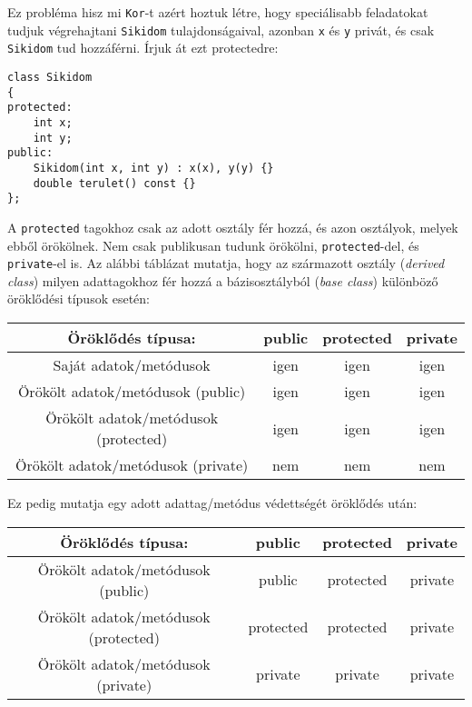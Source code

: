 \documentclass[a4paper,11.5pt,table]{article}
\begin{document}
	Ez probléma hisz mi \texttt{Kor}-t azért hoztuk létre, hogy speciálisabb feladatokat tudjuk végrehajtani \texttt{Sikidom} tulajdonságaival, azonban \texttt{x} és \texttt{y} privát, és csak \texttt{Sikidom} tud hozzáférni. Írjuk át ezt protectedre:
\begin{lstlisting}
class Sikidom
{
protected:
	int x;
	int y;
public:
	Sikidom(int x, int y) : x(x), y(y) {}
	double terulet() const {}
};
\end{lstlisting}
	A \texttt{protected} tagokhoz csak az adott osztály fér hozzá, és azon osztályok, melyek ebből örökölnek. Nem csak publikusan tudunk örökölni, \texttt{protected}-del, és \texttt{private}-el is. Az alábbi táblázat mutatja, hogy az származott osztály (\textit{derived class}) milyen adattagokhoz fér hozzá a bázisosztályból (\textit{base class}) különböző öröklődési típusok esetén:
	\begin{center}
		\setlength{\extrarowheight}{2pt}
		\begin{tabular}{|c||c|c|c|}
			\hline
			Öröklődés típusa:&public&protected&private\\
			\hline
			\hline
			Saját adatok/metódusok& \cellcolor{green!20}igen&\cellcolor{green!20}igen&\cellcolor{green!20}igen\\
			\hline
			Örökölt adatok/metódusok (public)&\cellcolor{green!20}igen&\cellcolor{green!20}igen&\cellcolor{green!20}igen\\
			\hline
			Örökölt adatok/metódusok (protected)&\cellcolor{green!20}igen&\cellcolor{green!20}igen&\cellcolor{green!20}igen\\
			\hline
			Örökölt adatok/metódusok (private)&\cellcolor{red!20}nem&\cellcolor{red!20}nem&\cellcolor{red!20}nem\\
			\hline
		\end{tabular}
	\end{center}
	Ez pedig mutatja egy adott adattag/metódus védettségét öröklődés után:
	\begin{center}
		\begin{tabular}{|c||c|c|c|}
			\hline
			Öröklődés típusa:&public&protected&private\\
			\hline
			\hline
			Örökölt adatok/metódusok (public)&\cellcolor{green!20}public&\cellcolor{orange!20}protected&\cellcolor{red!20}private\\
			\hline
			Örökölt adatok/metódusok (protected)&\cellcolor{orange!20}protected&\cellcolor{orange!20}protected&\cellcolor{red!20}private\\
			\hline
			Örökölt adatok/metódusok (private)&\cellcolor{red!20}private&\cellcolor{red!20}private&\cellcolor{red!20}private\\
			\hline
		\end{tabular}
	\end{center}
\end{document}
